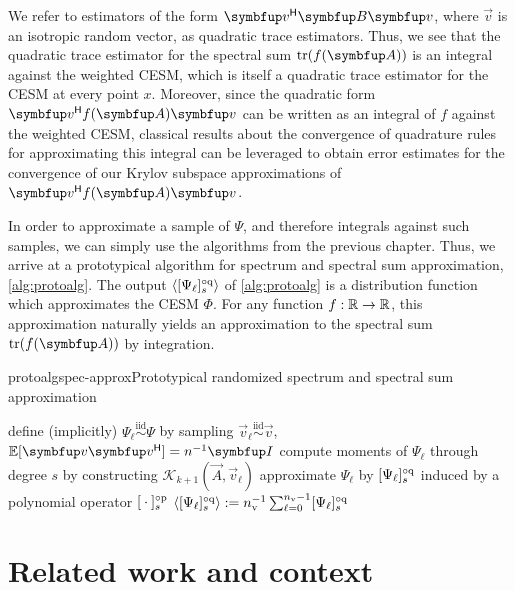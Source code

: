 We refer to estimators of the form \( \vec{v}^\cT \vec{B} \vec{v} \), where \( \vec{v} \) is an isotropic random vector, as quadratic trace estimators.
Thus, we see that the quadratic trace estimator for the spectral sum \( \tr(\fA) \) is an integral against the weighted CESM, which is itself a quadratic trace estimator for the CESM at every point \( x \).
Moreover, since the quadratic form \( \vec{v}^\cT \fA\vec{v} \) can be written as an integral of \( f \) against the weighted CESM, classical results about the convergence of quadrature rules for approximating this integral can be leveraged to obtain error estimates for the convergence of our Krylov subspace approximations of \( \vec{v}^\cT \fA\vec{v} \).

In order to approximate a sample of \( \Psi \), and therefore integrals against such samples, we can simply use the algorithms from the previous chapter. 
Thus, we arrive at a prototypical algorithm for spectrum and spectral sum approximation,\cref{alg:protoalg}.
The output \( \samp{\qq{\Psi_\ell}{s}} \) of \cref{alg:protoalg} is a distribution function which approximates the CESM \( \Phi \).
For any function \( f:\mathbb{R}\to\mathbb{R} \), this approximation naturally yields an approximation to the spectral sum \( \tr(\fA) \) by integration.

\begin{labelalgorithm}[H]{protoalg}{spec-approx}{Prototypical randomized spectrum and spectral sum approximation}
\begin{algorithmic}[1]
    \State define (implicitly) \( \Psi_\ell \stackrel{\text{iid}}{\sim} \Psi \) by sampling \( \vec{v}_\ell \stackrel{\text{iid}}{\sim} \vec{v} \), \( \EE[\vec{v}\vec{v}^\cT] = n^{-1} \vec{I} \) %
    \State compute moments of \( \Psi_{\ell} \) through degree \( s \) by constructing \( \mathcal{K}_{k+1}(\vec{A},\vec{v}_\ell) \) %
    \State approximate \( \Psi_{\ell} \) by \( \qq{\Psi_{\ell}}{s} \) induced by a polynomial operator \( \ff{\:\cdot\:}{s} \) 
    \EndFor
    \State \Return \( \samp{ \qq{\Psi_{\ell}}{s} } := \nv^{-1} \sum_{\ell=0}^{\nv-1} \qq{\Psi_\ell}{s} \)

\EndProcedure
\end{algorithmic}
\end{labelalgorithm}


\section{Related work and context}
\label{sec:past_work}

